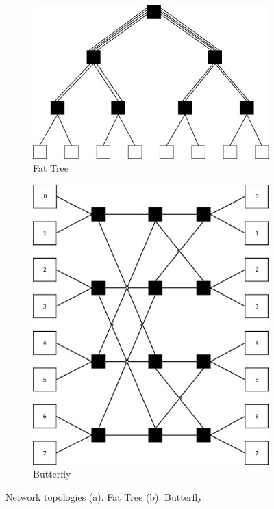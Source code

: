 \begin{figure}
\centering
\begin{subfigure}{.5\textwidth}
  \centering
  \includegraphics[width=.9\linewidth]{fat_tree.eps}
  \caption{Fat Tree}
  \label{fig:2.5a}
\end{subfigure}%
\begin{subfigure}{.5\textwidth}
  \centering
  \includegraphics[width=.9\linewidth]{butterfly.eps}
  \caption{Butterfly}
  \label{fig:2.5b}
\end{subfigure}
\caption[Fat Tree and Butterfly]{Network topologies (a). Fat Tree (b). Butterfly.}
\label{fig:2.5}
\vspace{10mm}
\end{figure}


